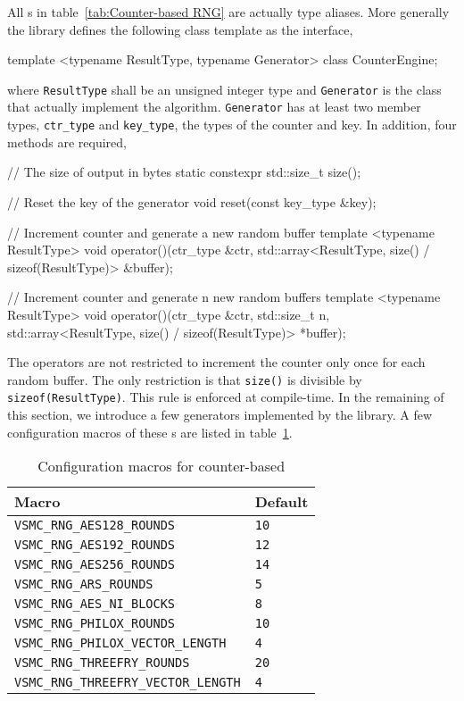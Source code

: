 All \rng{}s in table~\ref{tab:Counter-based RNG} are actually type aliases.
More generally the library defines the following class template as the
interface,
\begin{cppcode}
  template <typename ResultType, typename Generator>
  class CounterEngine;
\end{cppcode}
where \verb|ResultType| shall be an unsigned integer type and \verb|Generator|
is the class that actually implement the algorithm. \verb|Generator| has at
least two member types, \verb|ctr_type| and \verb|key_type|, the types of the
counter and key. In addition, four methods are required,
\begin{cppcode}
  // The size of output in bytes
  static constexpr std::size_t size();

  // Reset the key of the generator
  void reset(const key_type &key);

  // Increment counter and generate a new random buffer
  template <typename ResultType>
  void operator()(ctr_type &ctr,
      std::array<ResultType, size() / sizeof(ResultType)> &buffer);

  // Increment counter and generate n new random buffers
  template <typename ResultType>
  void operator()(ctr_type &ctr, std::size_t n,
      std::array<ResultType, size() / sizeof(ResultType)> *buffer);
\end{cppcode}
The operators are not restricted to increment the counter only once for each
random buffer. The only restriction is that \verb|size()| is divisible by
\verb|sizeof(ResultType)|. This rule is enforced at compile-time. In the
remaining of this section, we introduce a few generators implemented by the
library. A few configuration macros of these \rng{}s are listed in
table~\ref{tab:Configuration macros for counter-based RNG}.

\begin{table}
  \begin{tabularx}{\textwidth}{XX}
    \toprule
    Macro & Default \\
    \midrule
    \verb|VSMC_RNG_AES128_ROUNDS|          & \verb|10| \\
    \verb|VSMC_RNG_AES192_ROUNDS|          & \verb|12| \\
    \verb|VSMC_RNG_AES256_ROUNDS|          & \verb|14| \\
    \verb|VSMC_RNG_ARS_ROUNDS|             & \verb|5|  \\
    \verb|VSMC_RNG_AES_NI_BLOCKS|          & \verb|8|  \\
    \verb|VSMC_RNG_PHILOX_ROUNDS|          & \verb|10| \\
    \verb|VSMC_RNG_PHILOX_VECTOR_LENGTH|   & \verb|4|  \\
    \verb|VSMC_RNG_THREEFRY_ROUNDS|        & \verb|20| \\
    \verb|VSMC_RNG_THREEFRY_VECTOR_LENGTH| & \verb|4|  \\
    \bottomrule
  \end{tabularx}
  \caption{Configuration macros for counter-based \rng{}}
  \label{tab:Configuration macros for counter-based RNG}
\end{table}

